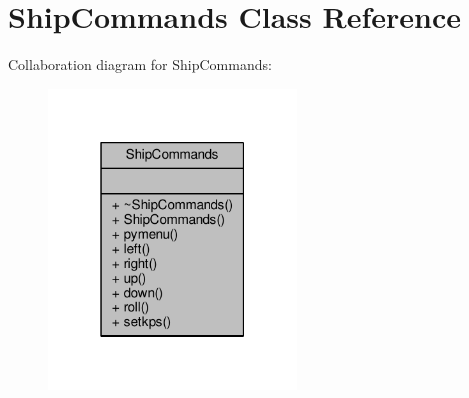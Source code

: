 \hypertarget{classShipCommands}{}\section{Ship\+Commands Class Reference}
\label{classShipCommands}


Collaboration diagram for Ship\+Commands\+:
\nopagebreak
\begin{figure}[H]
\begin{center}
\leavevmode
\includegraphics[width=187pt]{dc/da5/classShipCommands__coll__graph}
\end{center}
\end{figure}
